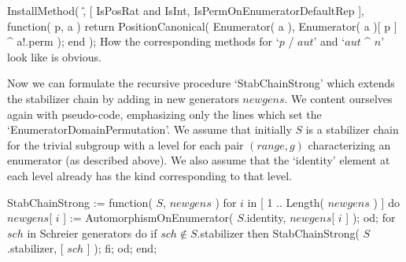\begintt
InstallMethod( \^,
        [ IsPosRat and IsInt, IsPermOnEnumeratorDefaultRep ],
    function( p, a )
    return PositionCanonical( Enumerator( a ),
                   Enumerator( a )[ p ] ^ a!.perm );
end );
\endtt
How the corresponding  methods for `$p$ /  $aut$' and `$aut$  ^ $n$' look
like is obvious.

Now we  can  formulate  the recursive procedure   `StabChainStrong' which
extends  the stabilizer chain by adding  in new  generators $newgens$. We
content  ourselves again   with pseudo-code, emphasizing  only  the lines
which set the `EnumeratorDomainPermutation'. We assume that initially $S$
is a stabilizer chain for the trivial subgroup with a level for each pair
$(range,g)$ characterizing an enumerator  (as  described above). We  also
assume that  the `identity'  element at each  level already  has the kind
corresponding to that level.

\)StabChainStrong := function( $S$, $newgens$ )
\)\quad for $i$  in [ 1 .. Length( $newgens$ ) ]  do
\)\qquad $newgens$[ $i$ ] := AutomorphismOnEnumerator( $S$.identity, %
         $newgens$[ $i$ ] );
\)\quad od;
\)
\)\quad for $sch$  in {\rm Schreier generators}  do
\)\qquad if $sch \notin S$.stabilizer  then
\)\qquad\quad StabChainStrong( $S$.stabilizer, [ $sch$ ] );
\)\qquad fi;
\)\quad od;
\)end;

